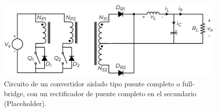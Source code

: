 \begin{figure}[h]
    \centering
    \includegraphics[scale=0.6]{Imagenes/Push-Pull.pdf}
    \caption{Circuito de un convertidor aislado tipo puente completo o full-bridge, con un rectificador de puente completo en el secundario (Placeholder).}
    \label{fullbridge}
\end{figure}

\afterpage{\blankpage}\newpage